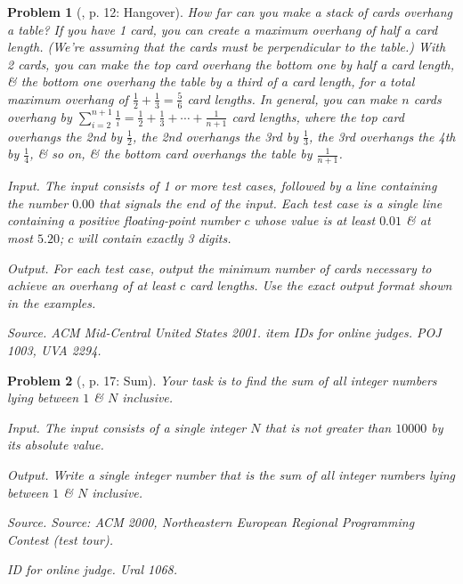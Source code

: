 \documentclass{article}
\newtheorem{problem}{Problem}
\begin{document}
\begin{problem}[\cite{Wu_Wang2016}, p. 12: Hangover]
	How far can you make a stack of cards overhang a table? If you have 1 card, you can create a maximum overhang of half a card length. (We're assuming that the cards must be perpendicular to the table.) With 2 cards, you can make the top card overhang the bottom one by half a card length, \& the bottom one overhang the table by a third of a card length, for a total maximum overhang of $\frac{1}{2} + \frac{1}{3} = \frac{5}{6}$ card lengths. In general, you can make $n$ cards overhang by $\sum_{i=2}^{n+1} \frac{1}{i} = \frac{1}{2} + \frac{1}{3} + \cdots + \frac{1}{n + 1}$ card lengths, where the top card overhangs the 2nd by $\frac{1}{2}$, the 2nd overhangs the 3rd by $\frac{1}{3}$, the 3rd overhangs the 4th by $\frac{1}{4}$, \& so on, \& the bottom card overhangs the table by $\frac{1}{n + 1}$.
	\item {\sf Input.} The input consists of 1 or more test cases, followed by a line containing the number $0.00$ that signals the end of the input. Each test case is a single line containing a positive floating-point number $c$ whose value is at least $0.01$ \& at most $5.20$; $c$ will contain exactly 3 digits.
	\item {\sf Output.} For each test case, output the minimum number of cards necessary to achieve an overhang of at least $c$ card lengths. Use the exact output format shown in the examples.
	\item {\sf Source.} ACM Mid-Central United States 2001.
	item {\sf IDs for online judges.} POJ 1003, UVA 2294.
\end{problem}

\begin{problem}[\cite{Wu_Wang2016}, p. 17: Sum]
	Your task is to find the sum of all integer numbers lying between $1$ \& $N$ inclusive.
	\item {\sf Input.} The input consists of a single integer $N$ that is not greater than $10000$ by its absolute value.
	\item {\sf Output.} Write a single integer number that is the sum of all integer numbers lying between $1$ \& $N$ inclusive.
	\item {\sf Source.} Source: ACM 2000, Northeastern European Regional Programming Contest (test tour).
	\item {\sf ID for online judge.} Ural 1068.
\end{problem}
\end{document}
